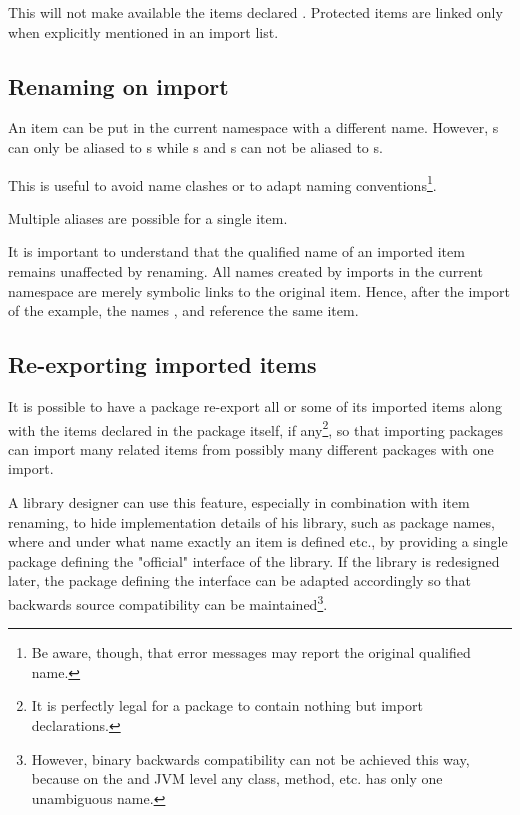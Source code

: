 This will not make available the items declared . 
Protected items are linked only when explicitly mentioned in an import list.


\subsection{Renaming on import} \label{renameitem}

An item can be put in the current namespace with a different name. However, s can only be aliased to s while s and s can not be aliased to s.

This is useful to avoid name clashes or to adapt naming conventions\footnote{
Be aware, though, that error messages may report the original qualified name.}.

Multiple aliases are possible for a single item.


It is important to understand that the qualified name of an imported item remains unaffected by renaming. 
All names created by imports in the current namespace are merely symbolic links to the original item. 
Hence, after the import of the example, the names ,  and  reference the same item. 

\subsection{Re-exporting imported items} \label{reexport}

It is possible to have a package re-export all or some of its imported items 
along with the items declared in the package itself, if any\footnote{
It is perfectly legal for a package to contain nothing but import declarations.}, 
so that importing  packages can import many related items from possibly many different packages with one import.

A library designer can use this feature, especially in combination with item renaming, 
to hide implementation details of his library, 
such as package names, where and under what name exactly an item is defined etc.,
by providing a single package defining the "official" interface of the library. 
If the library is redesigned later, the package defining the interface can be adapted accordingly 
so that backwards source compatibility can be maintained\footnote{
However, binary backwards compatibility can not be achieved this way, because on the \java{} and JVM level any class,
method, etc. has only one unambiguous name.}.

